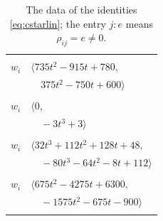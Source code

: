 \documentclass[11pt]{article}
\begin{document}
\begingroup\scriptsize
\setlength{\LTcapwidth}{\textwidth}
\begin{longtable}{@{}ll@{}}
\caption{The data of the identities \eqref{eq:cstarlin}; the entry $j{:}e$ means $\rho_{ij}=e\neq0$.}\label{tab:cstar}\\
\hline\endfirsthead\hline\endhead\hline\endfoot
\multicolumn{2}{@{}p{0.97\textwidth}@{}}{$i=0$, $D_i=2$, $\rho_{ij}$: $1{:}2, \allowbreak 5{:}3, \allowbreak 6{:}1, \allowbreak 7{:}3, \allowbreak 24{:}1, \allowbreak 25{:}2, \allowbreak 26{:}3, \allowbreak 27{:}3, \allowbreak 30{:}3, \allowbreak 34{:}1, \allowbreak 38{:}2, \allowbreak 39{:}3, \allowbreak 44{:}1, \allowbreak 53{:}3, \allowbreak 56{:}2$}\\
$w_i$ & $\langle 735t^{2}-915t+780,$\\
 & $\quad 375t^{2}-750t+600\rangle$\\
\addlinespace[2pt]
\multicolumn{2}{@{}p{0.97\textwidth}@{}}{$i=1$, $D_i=1$, $\rho_{ij}$: $0{:}2, \allowbreak 3{:}2, \allowbreak 4{:}1, \allowbreak 9{:}3, \allowbreak 10{:}1, \allowbreak 12{:}2, \allowbreak 29{:}2, \allowbreak 31{:}2, \allowbreak 41{:}1, \allowbreak 54{:}2$}\\
$w_i$ & $\langle 0,$\\
 & $\quad -3t^{3}+3\rangle$\\
\addlinespace[2pt]
\multicolumn{2}{@{}p{0.97\textwidth}@{}}{$i=2$, $D_i=2$, $e_i=2$, $\rho_{ij}$: $3{:}2, \allowbreak 4{:}1, \allowbreak 9{:}3, \allowbreak 10{:}3, \allowbreak 20{:}2, \allowbreak 36{:}2, \allowbreak 46{:}2, \allowbreak 47{:}2, \allowbreak 49{:}2$}\\
$w_i$ & $\langle 32t^{3}+112t^{2}+128t+48,$\\
 & $\quad -80t^{3}-64t^{2}-8t+112\rangle$\\
\addlinespace[2pt]
\multicolumn{2}{@{}p{0.97\textwidth}@{}}{$i=3$, $D_i=1$, $\rho_{ij}$: $1{:}2, \allowbreak 2{:}2, \allowbreak 7{:}2, \allowbreak 8{:}2, \allowbreak 14{:}3, \allowbreak 22{:}1, \allowbreak 26{:}2, \allowbreak 28{:}2, \allowbreak 30{:}3, \allowbreak 31{:}1, \allowbreak 32{:}3, \allowbreak 35{:}2, \allowbreak 37{:}2, \allowbreak 38{:}1, \allowbreak 47{:}3, \allowbreak 48{:}3, \allowbreak 51{:}3, \allowbreak 53{:}2, \allowbreak 55{:}1, \allowbreak 56{:}2$}\\
$w_i$ & $\langle 675t^{2}-4275t+6300,$\\
 & $\quad -1575t^{2}-675t-900\rangle$\\
\addlinespace[2pt]
\multicolumn{2}{@{}p{0.97\textwidth}@{}}{$i=4$, $D_i=2$, $\rho_{ij}$: $1{:}3, \allowbreak 2{:}3, \allowbreak 5{:}2, \allowbreak 23{:}3, \allowbreak 24{:}2, \allowbreak 30{:}1, \allowbreak 31{:}3, \allowbreak 35{:}3, \allowbreak 38{:}2, \allowbreak 42{:}2, \allowbreak 45{:}2, \allowbreak 46{:}3$}\\

\end{longtable}
\end{document}
